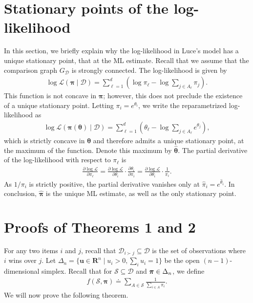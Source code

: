 \newcommand{\D}[2]{\ensuremath{\mathcal{D}_{#1 \succ #2}}}

\section{Stationary points of the log-likelihood}

In this section, we briefly explain why the log-likelihood in Luce's model has a unique stationary point, that at the ML estimate.
Recall that we assume that the comparison graph $G_{\mathcal{D}}$ is strongly connected.
The log-likelihood is given by
\begin{align}
\label{eq:loglik}
\log \mathcal{L}(\bm{\pi} \mid \mathcal{D}) = \sum_{\ell = 1}^d \left( \log \pi_\ell - \log{\sum_{j \in A_\ell} \pi_j} \right).
\end{align}
This function is not concave in $\bm{\pi}$; however, this does not preclude the existence of a unique stationary point.
Letting $\pi_i = e^{\theta_i}$, we write the reparametrized log-likelihood as
\begin{align*}
\log \mathcal{L}(\bm{\pi}(\bm{\theta}) \mid \mathcal{D}) = \sum_{\ell = 1}^d \left( \theta_\ell - \log{\sum_{j \in A_\ell} e^{\theta_j}} \right),
\end{align*}
which is strictly concave in $\bm{\theta}$ and therefore admits a unique stationary point, at the maximum of the function.
Denote this maximum by $\hat{\bm{\theta}}$.
The partial derivative of the log-likelihood with respect to $\pi_\ell$ is
\begin{align}
\frac{\partial \log \mathcal{L}}{\partial \pi_\ell}
  = \frac{\partial \log \mathcal{L}}{\partial \theta_i} \cdot \frac{\partial \theta_i}{\partial \pi_i}
  = \frac{\partial \log \mathcal{L}}{\partial \theta_i} \cdot \frac{1}{\pi_i}.
\end{align}
As $1/\pi_i$ is strictly positive, the partial derivative vanishes only at $\hat{\pi}_i = e^{\hat{\theta}_i}$.
In conclusion, $\hat{\bm{\pi}}$ is the unique ML estimate, as well as the only stationary point.


\section{Proofs of Theorems 1 and 2}


For any two items $i$ and $j$, recall that $\mathcal{D}_{i \succ j} \subseteq \mathcal{D}$ is the set of observations where $i$ wins over $j$.
Let $\Delta_n = \{ \bm{u} \in \mathbf{R}^n \mid u_i > 0, \sum_i u_i = 1 \}$ be the open $(n\!-\!1)$-dimensional simplex.
Recall that for $\mathcal{S} \subseteq \mathcal{D}$ and $\bm{\pi} \in \Delta_n$, we define
\begin{align}
\label{eq:rate}
f(\mathcal{S}, \bm{\pi}) \doteq \sum_{A \in \mathcal{S}} \frac{1}{\sum_{i \in A} \pi_i}.
\end{align}
We will now prove the following theorem.

